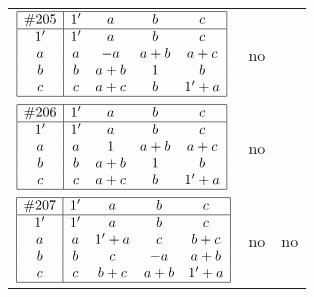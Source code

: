 \documentclass[12pt]{article}
\newcommand{\join}{\mathbin{+}}%
\newcommand{\id}{{1'}}%
\renewcommand{\top}{1}%
\begin{document}
\begin{center}
\begin{longtable}{l|c|c}
$
\begin{array}{|c|cccc|} \hline
\#205 & \id & a & b & c \\ \hline
\id & \id & a & b & c \\
a & a & -a & a \join b & a \join c \\
b & b & a \join b & \top & b \\
c & c & a \join c & b & \id \join a \\ \hline
\end{array}
$
 & no  
 & \adjustbox{valign=c, max height=1.6cm}{$
\left[ \begin{array}{ccccccc}
\id & a & b & c & b & b & b \\ 
a & \id & a & a & b & b & b \\ 
b & a & \id & b & b & b & b \\ 
c & a & b & \id & b & b & b \\ 
b & b & b & b & \id & c & a \\ 
b & b & b & b & c & \id & c \\ 
b & b & b & b & a & c & \id
\end{array}\right]
$}      \\[15mm]

$
\begin{array}{|c|cccc|} \hline
\#206 & \id & a & b & c \\ \hline
\id & \id & a & b & c \\
a & a & \top & a \join b & a \join c \\
b & b & a \join b & \top & b \\
c & c & a \join c & b & \id \join a \\ \hline
\end{array}
$
 & no  
 & \adjustbox{valign=c, max height=1.6cm}{$
\left[ \begin{array}{cccccc}
\id & a & a & b & c & b \\ 
a & \id & a & a & a & b \\ 
a & a & \id & b & c & b \\ 
b & a & b & \id & b & b \\ 
c & a & c & b & \id & b \\ 
b & b & b & b & b & \id
\end{array}\right]
$}
      \\[15mm]

$
\begin{array}{|c|cccc|} \hline
\#207 & \id & a & b & c \\ \hline
\id & \id & a & b & c \\
a & a & \id \join a & c & b \join c \\
b & b & c & -a & a \join b \\
c & c & b \join c & a \join b & \id \join a \\ \hline
\end{array}
$
 & no  
 & no      \\[15mm]


\end{longtable}
\end{center}
\end{document}
